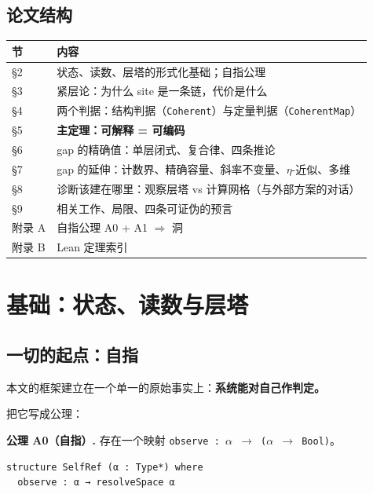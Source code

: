 \documentclass[11pt,a4paper]{ctexart}
\begin{document}
\subsection{论文结构}

\begin{center}\small
\begin{tabular}{ll}
\toprule
节 & 内容 \\
\midrule
§2 & 状态、读数、层塔的形式化基础；自指公理 \\
§3 & 紧层论：为什么 site 是一条链，代价是什么 \\
§4 & 两个判据：结构判据（\texttt{Coherent}）与定量判据（\texttt{CoherentMap}） \\
§5 & \textbf{主定理：可解释 = 可编码} \\
§6 & gap 的精确值：单层闭式、复合律、四条推论 \\
§7 & gap 的延伸：计数界、精确容量、斜率不变量、\ensuremath{\eta}-近似、多维 \\
§8 & 诊断该建在哪里：观察层塔 vs 计算网格（与外部方案的对话） \\
§9 & 相关工作、局限、四条可证伪的预言 \\
附录 A & 自指公理 A0 + A1 \ensuremath{\Longrightarrow} 洞 \\
附录 B & Lean 定理索引 \\
\bottomrule
\end{tabular}
\end{center}

\bigskip

\section{基础：状态、读数与层塔}

\subsection{一切的起点：自指}

本文的框架建立在一个单一的原始事实上：\textbf{系统能对自己作判定。}

把它写成公理：

\textbf{公理 A0（自指）.} 存在一个映射 \texttt{observe : \ensuremath{\alpha} \ensuremath{\to} (\ensuremath{\alpha} \ensuremath{\to} Bool)}。

\begin{lstlisting}
structure SelfRef (α : Type*) where
  observe : α → resolveSpace α
\end{lstlisting}
\end{document}
